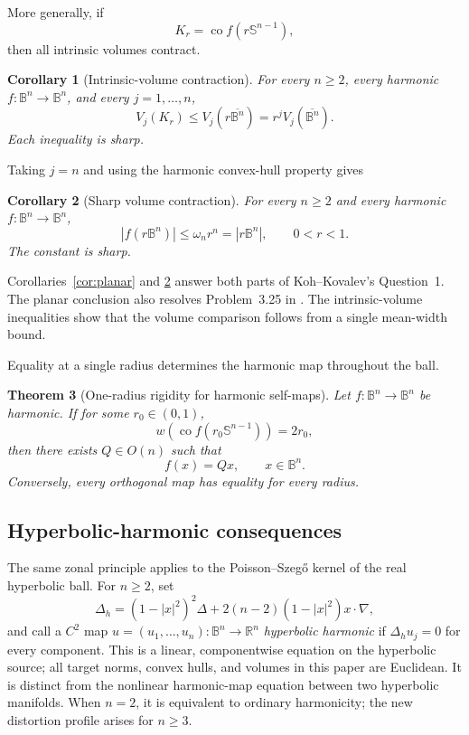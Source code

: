 \documentclass[11pt,reqno]{amsart}
\newtheorem{theorem}{Theorem}[section]
\newtheorem{corollary}[theorem]{Corollary}
\theoremstyle{remark}
\begin{document}
More generally, if
\[
 K_r=\operatorname{co}f(r\mathbb S^{n-1}),
\]
then all intrinsic volumes contract.

\begin{corollary}[Intrinsic-volume contraction]
\label{cor:intrinsic}
For every $n\ge2$, every harmonic
$f:\mathbb B^n\to\mathbb B^n$, and every $j=1,\ldots,n$,
\begin{equation}\label{eq:intro-intrinsic}
 V_j(K_r)
 \le
 V_j(r\overline{\mathbb B^n})
 =
 r^jV_j(\overline{\mathbb B^n}).
\end{equation}
Each inequality is sharp.
\end{corollary}

Taking $j=n$ and using the harmonic convex-hull property gives

\begin{corollary}[Sharp volume contraction]
\label{cor:volume}
For every $n\ge2$ and every harmonic
$f:\mathbb B^n\to\mathbb B^n$,
\begin{equation}\label{eq:volume}
 |f(r\mathbb B^n)|
 \le
 \omega_n r^n
 =
 |r\mathbb B^n|,
 \qquad 0<r<1.
\end{equation}
The constant is sharp.
\end{corollary}

Corollaries~\ref{cor:planar} and \ref{cor:volume} answer both parts of
Koh--Kovalev's Question~1.  The planar conclusion also resolves
Problem~3.25 in \cite{BshoutyLyzzaik}.  The intrinsic-volume inequalities
show that the volume comparison follows from a single mean-width bound.

Equality at a single radius determines the harmonic map throughout the ball.

\begin{theorem}[One-radius rigidity for harmonic self-maps]
\label{thm:harmonic-rigidity}
Let $f:\mathbb B^n\to\mathbb B^n$ be harmonic.  If for some
$r_0\in(0,1)$,
\[
 w\!\left(
 \operatorname{co}f(r_0\mathbb S^{n-1})
 \right)
 =
 2r_0,
\]
then there exists $Q\in O(n)$ such that
\[
 f(x)=Qx,\qquad x\in\mathbb B^n.
\]
Conversely, every orthogonal map has equality for every radius.
\end{theorem}

\subsection{Hyperbolic-harmonic consequences}\label{sec:intro-hyperbolic}

The same zonal principle applies to the Poisson--Szeg\H{o} kernel of the real hyperbolic ball.  For $n\ge2$, set
\begin{equation}\label{eq:hyp-laplacian-intro}
 \Delta_h=(1-|x|^2)^2\Delta+2(n-2)(1-|x|^2)x\cdot\nabla,
\end{equation}
and call a $C^2$ map $u=(u_1,\ldots,u_n):\mathbb B^n\to\mathbb R^n$
\emph{hyperbolic harmonic} if $\Delta_hu_j=0$ for every component.
This is a linear, componentwise equation on the hyperbolic source; all
target norms, convex hulls, and volumes in this paper are Euclidean.
It is distinct from the nonlinear harmonic-map equation between two
hyperbolic manifolds.  When $n=2$, it is equivalent to ordinary harmonicity;
the new distortion profile arises for $n\ge3$.
\end{document}
